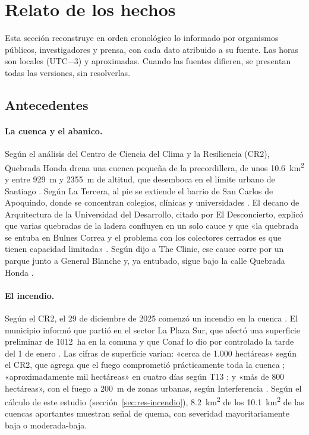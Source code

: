 \section{Relato de los hechos}\label{sec:relato}
Esta sección reconstruye en orden cronológico lo informado por organismos públicos, investigadores y prensa, con cada dato atribuido a su fuente. Las horas son locales (UTC$-$3) y aproximadas. Cuando las fuentes difieren, se presentan todas las versiones, sin resolverlas.

\subsection*{Antecedentes}
\paragraph{La cuenca y el abanico.} Según el análisis del Centro de Ciencia del Clima y la Resiliencia (CR2), Quebrada Honda drena una cuenca pequeña de la precordillera, de unos \SI{10,6}{km^2} y entre \SI{929}{m} y \SI{2355}{m} de altitud, que desemboca en el límite urbano de Santiago \citep{cr2_2026}. Según La Tercera, al pie se extiende el barrio de San Carlos de Apoquindo, donde se concentran colegios, clínicas y universidades \citep{latercera2026zonacero}. El decano de Arquitectura de la Universidad del Desarrollo, citado por El Desconcierto, explicó que varias quebradas de la ladera confluyen en un solo cauce y que «la quebrada se entuba en Bulnes Correa y el problema con los colectores cerrados es que tienen capacidad limitada» \citep{eldesconcierto2026}. Según dijo a The Clinic, ese cauce corre por un parque junto a General Blanche y, ya entubado, sigue bajo la calle Quebrada Honda \citep{theclinic2026allard}.

\paragraph{El incendio.} Según el CR2, el 29 de diciembre de 2025 comenzó un incendio en la cuenca \citep{cr2_2026}. El municipio informó que partió en el sector La Plaza Sur, que afectó una superficie preliminar de \SI{1012}{ha} en la comuna y que Conaf lo dio por controlado la tarde del 1 de enero \citep{lascondes2026}. Las cifras de superficie varían: «cerca de 1.000 hectáreas» según el CR2, que agrega que el fuego comprometió prácticamente toda la cuenca \citep{cr2_2026}; «aproximadamente mil hectáreas» en cuatro días según T13 \citep{t13_2026mallas}; y «más de 800 hectáreas», con el fuego a \SI{200}{m} de zonas urbanas, según Interferencia \citep{interferencia2026}. Según el cálculo de este estudio (sección~\ref{sec:res-incendio}), \SI{8,2}{km^2} de los \SI{10,1}{km^2} de las cuencas aportantes muestran señal de quema, con severidad mayoritariamente baja o moderada-baja.


